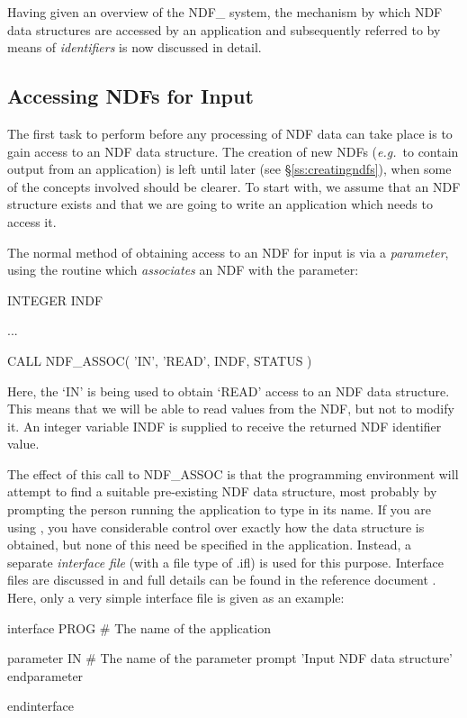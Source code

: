 \documentclass[twoside,11pt,nolof]{starlink}
\providecommand{\st}[1]{{\emph{#1}}}
\begin{document}
Having given an overview of the NDF\_ system, the mechanism by which NDF data
structures are accessed by an application and subsequently referred to by means
of \st{identifiers\/} is now discussed in detail.

\subsection{\label{ss:associnput}Accessing NDFs for Input}

The first task to perform before any processing of NDF data can take place is
to gain access to an NDF data structure.
The creation of new NDFs (\st{e.g.}\ to contain output from an application)
is left until later (see \S\ref{ss:creatingndfs}), when some of the concepts
involved should be clearer.
To start with, we assume that an NDF structure exists and that we are  going to
write an application which needs to access it.

The normal method of obtaining access to an NDF for input is via a
\st{parameter}, using the routine  which \st{associates\/}
an NDF with the parameter:

\small
\begin{terminalv}
      INTEGER INDF

      ...

      CALL NDF_ASSOC( 'IN', 'READ', INDF, STATUS )
\end{terminalv}
\normalsize

Here, the `IN' is being used to obtain `READ' access to an NDF data structure.
This means that we will be able to read values from the NDF, but not to
modify it.
An integer variable INDF is supplied to receive the returned NDF identifier
value.

The effect of this call to NDF\_ASSOC is that the programming
environment will attempt to find a suitable pre-existing NDF data
structure, most probably by prompting the person running the
application to type in its name.
If you are using , you have considerable control over exactly how
the data structure is obtained, but none of this need be specified in
the application.
Instead, a separate \st{interface file\/} (with a file type of .ifl) is used
for this purpose.
Interface files are discussed in  and full
details can be found in the reference document .
Here, only a very simple interface file is given as an example:

\small
\begin{terminalv}
   interface PROG              # The name of the application

      parameter IN             # The name of the parameter
         prompt   'Input NDF data structure'
      endparameter

   endinterface
\end{terminalv}
\normalsize
\end{document}
